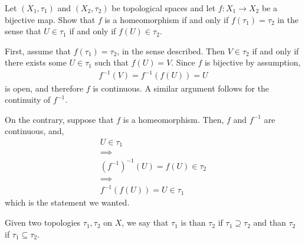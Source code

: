 \begin{exercise}
	\begin{problem}
	Let $ ( X_{1}, \tau_{1} ) $ and $ ( X_{2}, \tau_{2} ) $ be topological spaces and let $ f:X_{1}\to X_{2} $ be a bijective map. Show that $ f $ is a homeomorphism if and only if $ f ( \tau_{1} ) = \tau_{2} $ in the sense that $ U \in \tau_{1} $ if and only if $ f ( U ) \in \tau_{2} $.
	\end{problem}
	\begin{solution}
		First, assume that $ f ( \tau_{1} ) = \tau_{2} $, in the sense described. Then $ V \in \tau_{2} $ if and only if there exists some $ U \in \tau_{1} $ such that $ f ( U ) = V $. Since $ f $ is bijective by assumption,
		\begin{align*}
			f ^{-1}( V ) = f ^{-1}( f ( U ) ) = U
		\end{align*}
		is open, and therefore $ f $ is continuous. A similar argument follows for the continuity of $ f ^{-1} $.

		On the contrary, suppose that $ f $ is a homeomorphism. Then, $ f $ and $ f ^{-1} $ are continuous, and,
		\begin{gather*}
			U \in \tau_{1}\\
			\implies \\
			( f ^{-1} )^{-1}( U ) = f ( U ) \in \tau_{2}\\
			\implies \\
			f ^{-1}( f ( U ) ) = U \in \tau_{1}
		\end{gather*}
		which is the statement we wanted.
	\end{solution}
\end{exercise}

\begin{definition}
	Given two topologies $ \tau_{1}, \tau_{2} $ on $ X $, we say that $ \tau_{1} $ is  than $ \tau_{2} $ if $ \tau_{1} \supseteq \tau_{2} $ and  than $ \tau_{2} $ if $ \tau_{1} \subseteq \tau_{2} $.
\end{definition}

